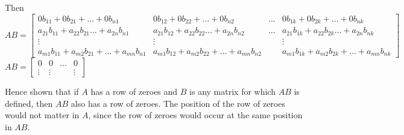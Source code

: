 \documentclass[addpoints]{exam}
\begin{document}
\begin{sloppypar}
\begin{questions}
\begin{solution}
        Then \\ $ AB = \begin{bmatrix}
            0b_{11} + 0b_{21} + ... + 0b_{n1} & 0b_{12} + 0b_{22} + ... + 0b_{n2} & ... & 0b_{1k} + 0b_{2k} + ... +0b_{nk} \\ 
            a_{21}b_{11} + a_22b_{21} ... +a_{2n}b_{n1} & a_{21}b_{12} + a_22b_{22} ... +a_{2n}b_{n2} & ... & a_{21}b_{1k} + a_22b_{2k} ... +a_{2n}b_{nk}  \\ 
            \vdots & \vdots &  & \vdots \\ 
            a_{m1}b_{11} + a_{m2}b_{21} + ... +a_{mn}b_{n1} & a_{m1}b_{12} + a_{m2}b_{22} + ... +a_{mn}b_{n2} & & a_{m1}b_{1k} + a_{m2}b_{2k} + ... +a_{mn}b_{nk}  
        \end{bmatrix} $ \\ 
        $ AB = \begin{bmatrix}
            0 & 0 & ... & 0 \\ 
            \vdots & \vdots & & \vdots
        \end{bmatrix} $

        Hence shown that if $A$ has a row of zeroes and $B$ is any matrix for which $AB$ is defined, then $AB$ also has a row of zeroes. The position of the row of zeroes would not matter in $A$, since the row of zeroes would occur at the same position in $AB$.  
    \end{solution}

\end{questions}
\end{sloppypar}
\end{document}
